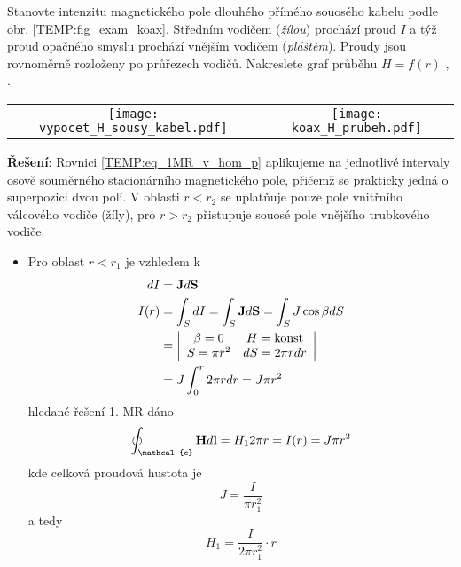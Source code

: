 \begin{mdframed}[style=mdexam]
  \begin{example}\label{TEMP:ex_koax_H}
    Stanovte intenzitu magnetického pole dlouhého přímého souosého kabelu podle obr.
    \ref{TEMP:fig_exam_koax}. Středním vodičem (\emph{žílou}) prochází proud $I$ a týž proud
    opačného smyslu prochází vnějším vodičem (\emph{pláštěm}). Proudy jsou rovnoměrně rozloženy po
    průřezech vodičů. Nakreslete graf průběhu $H = f(r)$ \cite[s.~92]{Dufek1970},
    \cite[s.~195]{Kotlan1999}.
    
    {\centering
    \begin{tabular}{cc}
      \texttt{[image: vypocet\_H\_sousy\_kabel.pdf]}   &
      \texttt{[image: koax\_H\_prubeh.pdf]}
    \end{tabular}
    \captionsetup{type=figure}
    \label{TEMP:fig_exam_koax}
    \par}
    
    \textbf{Řešení}: \newline Rovnici \ref{TEMP:eq_1MR_v_hom_p} aplikujeme na jednotlivé intervaly
    osově souměrného stacionárního magnetického pole, přičemž se prakticky jedná o superpozici dvou
    polí. V oblasti $r<r_2$ se uplatňuje pouze pole vnitřního válcového vodiče (žíly), pro $r>r_2$
    přistupuje souosé pole vnějšího trubkového vodiče.
    \begin{itemize}
      \item Pro oblast $r<r_1$ je vzhledem k 
            \begin{align*}
                dI    &= \mathbf{J}d\mathbf{S} \\
                I(r)  &= \int_S dI = \int_S \mathbf{J}d\mathbf{S} = \int_S J\cos\beta dS \\
                      &= \left\lvert\begin{array}{cc}
                                \beta = 0 & H = \text{konst} \\
                              S = \pi r^2 & dS = 2\pi rdr \\
                              \end{array}
                        \right\rvert                                           \\
                      &= J\int_0^r 2\pi rdr = J\pi r^2
            \end{align*}
            hledané řešení 1. MR dáno 
            $$\oint_{\mathcal{c}}\vr{H}d\vr{l} = H_1 2\pi r = I(r) = J\pi r^2$$ kde celková proudová
            hustota je  $$J = \frac{I}{\pi r_1^2}$$ a tedy
            $$H_1 = \frac{I}{2\pi r_1^2}\cdot r$$
            

\end{itemize}
\end{example}
\end{mdframed}

